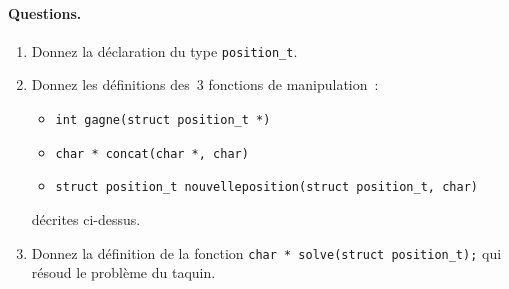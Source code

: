 \paragraph{Questions.}
\begin{enumerate}
\item Donnez la d\'eclaration du type \texttt{position\_t}.
\item Donnez les d\'efinitions des~$3$ fonctions de manipulation~:
  \begin{itemize}
  \item \verb?int gagne(struct position_t *)?
  \item \verb?char * concat(char *, char)?
  \item \verb?struct position_t nouvelleposition(struct position_t, char)?
  \end{itemize}
   d\'ecrites ci-dessus.
\item Donnez la d\'efinition de la fonction %
  \verb?char * solve(struct position_t);? qui r\'esoud le
  probl\`eme du taquin.
\end{enumerate}
